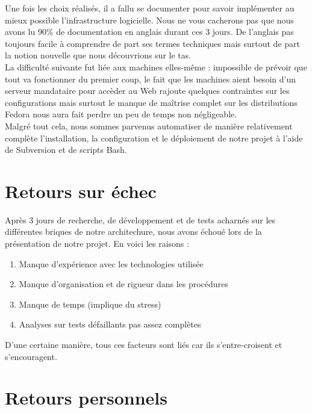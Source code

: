 \documentclass[11pt,a4paper]{report}
\begin{document}
            Une fois les choix réalisés, il a fallu se documenter pour savoir implémenter au mieux possible l'infrastructure logicielle. Nous ne vous cacherons pas que nous avons lu 90\% de documentation en anglais durant ces 3 jours. De l'anglais pas toujours facile à comprendre de part ses termes techniques mais surtout de part la notion nouvelle que nous découvrions sur le tas.\\
            
            La difficulté suivante fut liée aux machines elles-même : impossible de prévoir que tout va fonctionner du premier coup, le fait que les machines aient besoin d'un serveur mandataire pour accèder au Web rajoute quelques contraintes sur les configurations mais surtout le manque de maîtrise complet sur les distributions Fedora nous aura fait perdre un peu de temps non négligeable.\\
            
            Malgré tout cela, nous sommes parvenus automatiser de manière relativement complète l'installation, la configuration et le déploiement de notre projet à l'aide de Subversion et de scripts Bash.
        
        \section{Retours sur échec}
        
            Après 3 jours de recherche, de développement et de tests acharnés sur les différentes briques de notre architechure, nous avons échoué lors de la présentation de notre projet. En voici les raisons :\\
            
            \begin{enumerate}
                \item Manque d'expérience avec les technologies utilisée
                \item Manque d'organisation et de rigueur dans les procédures
                \item Manque de temps (implique du stress)
                \item Analyses sur tests défaillants pas assez complètes
            \end{enumerate}
            
            D'une certaine manière, tous ces facteurs sont liés car ils s'entre-croisent et s'encouragent.
        
        \section{Retours personnels}
\end{document}
